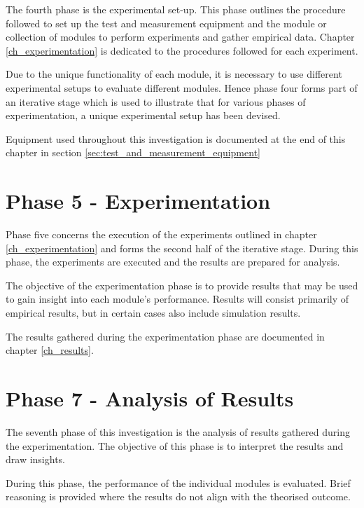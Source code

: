 The fourth phase is the experimental set-up. This phase outlines the procedure followed to set up the test and measurement equipment and the module or collection of modules to perform experiments and gather empirical data. Chapter \ref{ch_experimentation} is dedicated to the procedures followed for each experiment.

Due to the unique functionality of each module, it is necessary to use different experimental setups to evaluate different modules. Hence phase four forms part of an iterative stage which is used to illustrate that for various phases of experimentation, a unique experimental setup has been devised.

Equipment used throughout this investigation is documented at the end of this chapter in section \ref{sec:test_and_measurement_equipment}





\section{Phase 5 - Experimentation}

Phase five concerns the execution of the experiments outlined in chapter \ref{ch_experimentation} and forms the second half of the iterative stage. During this phase, the experiments are executed and the results are prepared for analysis.

The objective of the experimentation phase is to provide results that may be used to gain insight into each module's performance. Results will consist primarily of empirical results, but in certain cases also include simulation results.

The results gathered during the experimentation phase are documented in chapter \ref{ch_results}.


\section{Phase 7 - Analysis of Results}

The seventh phase of this investigation is the analysis of results gathered during the experimentation. The objective of this phase is to interpret the results and draw insights.

During this phase, the performance of the individual modules is evaluated. Brief reasoning is provided where the results do not align with the theorised outcome.

